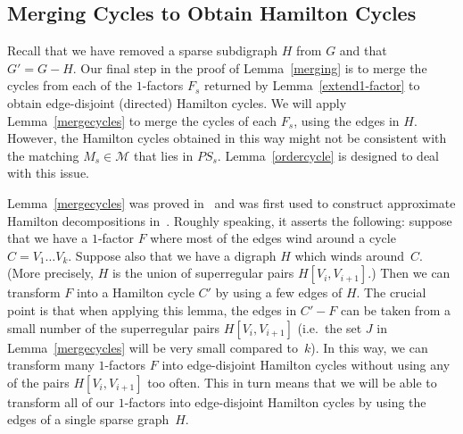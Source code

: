\documentclass{memo-l}
\numberwithin{section}{chapter}
\numberwithin{equation}{section}
\numberwithin{firstthm}{section}
\numberwithin{figure}{section}
\begin{document}
{\subsection{Merging Cycles to Obtain Hamilton Cycles} \label{sec:merge}

Recall that we have removed a sparse subdigraph $H$ from $G$ and that $G'=G-H$.
Our final step in the proof of Lemma~\ref{merging} is to merge the cycles from each of the $1$-factors $F_s$ returned by
Lemma~\ref{extend1-factor} to obtain edge-disjoint (directed) Hamilton cycles. 
We will apply Lemma~\ref{mergecycles} to merge the cycles of each $F_s$, using the edges in $H$.
However, the Hamilton cycles obtained in this way might not be consistent with the matching $M_s \in \mathcal{M}$
that lies in $PS_s$. Lemma~\ref{ordercycle} is designed to deal with this issue.

Lemma~\ref{mergecycles} was proved in~\cite{Kelly} and was first used to construct approximate Hamilton decompositions in~\cite{OS}.
Roughly speaking, it asserts the following:
suppose that we have a $1$-factor $F$ where most of the edges wind around a cycle $C=V_1\dots V_k$.
Suppose also that we have a digraph $H$ which winds around~$C$. (More precisely, $H$ is the
union of superregular pairs $H[V_i,V_{i+1}]$.)
Then we can transform $F$ into a Hamilton cycle $C'$ by using a few edges of $H$.
The crucial point is that when applying this lemma, the edges in $C'-F$ can be taken from a small number of the
superregular pairs $H[V_i,V_{i+1}]$ (i.e.~the set $J$ in Lemma~\ref{mergecycles} will be very small compared to~$k$).
In this way, we can transform many $1$-factors $F$ into edge-disjoint Hamilton cycles without using any of the pairs $H[V_i,V_{i+1}]$ too often.
This in turn means that we will be able to transform all of our $1$-factors into edge-disjoint Hamilton cycles
by using the edges of a single sparse graph~$H$.

}
\end{document}
